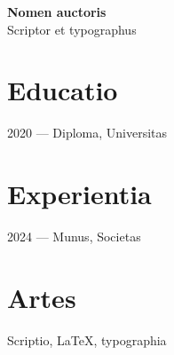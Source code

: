 \documentclass[11pt]{article}
\begin{document}
{\Large\bfseries Nomen auctoris}\\[4pt]
{\large Scriptor et typographus}

\vspace{8pt}

\section*{Educatio}
2020 — Diploma, Universitas

\section*{Experientia}
2024 — Munus, Societas

\section*{Artes}
Scriptio, LaTeX, typographia
\end{document}
